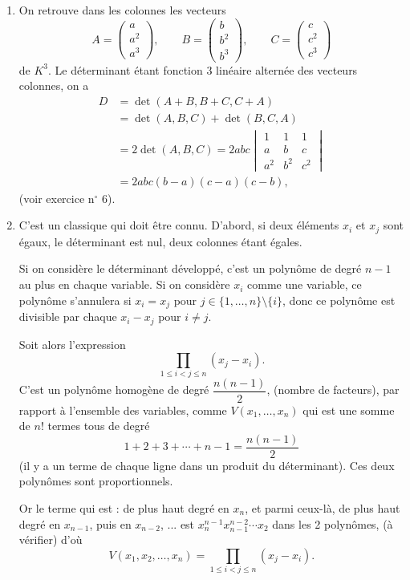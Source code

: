 \begin{enumerate}[label=\arabic*.,leftmargin=2.2em,itemsep=1.2em]
\item On retrouve dans les colonnes les vecteurs
\[
A=\begin{pmatrix}a\\a^2\\a^3\end{pmatrix},\qquad
B=\begin{pmatrix}b\\b^2\\b^3\end{pmatrix},\qquad
C=\begin{pmatrix}c\\c^2\\c^3\end{pmatrix}
\]
de $K^3$. Le déterminant étant fonction 3 linéaire alternée des vecteurs colonnes, on a
\[
\begin{aligned}
D&=\det(A+B,B+C,C+A)\\
&=\det(A,B,C)+\det(B,C,A)\\
&=2\det(A,B,C)
=2abc\begin{vmatrix}1&1&1\\a&b&c\\a^2&b^2&c^2\end{vmatrix}\\
&=2abc(b-a)(c-a)(c-b),
\end{aligned}
\]
(voir exercice n$^\circ$ 6).

\item C'est un classique qui doit être connu. D'abord, si deux éléments $x_i$ et $x_j$ sont égaux, le déterminant est nul, deux colonnes étant égales.

Si on considère le déterminant développé, c'est un polynôme de degré $n-1$ au plus en chaque variable. Si on considère $x_i$ comme une variable, ce polynôme s'annulera si $x_i=x_j$ pour $j\in\{1,\ldots,n\}\setminus\{i\}$, donc ce polynôme est divisible par chaque $x_i-x_j$ pour $i\ne j$.

Soit alors l'expression
\[
\prod_{1\le i<j\le n}(x_j-x_i).
\]
C'est un polynôme homogène de degré $\dfrac{n(n-1)}2$, (nombre de facteurs), par rapport à l'ensemble des variables, comme $V(x_1,\ldots,x_n)$ qui est une somme de $n!$ termes tous de degré
\[
1+2+3+\cdots+n-1=\frac{n(n-1)}2
\]
(il y a un terme de chaque ligne dans un produit du déterminant). Ces deux polynômes sont proportionnels.

Or le terme qui est : de plus haut degré en $x_n$, et parmi ceux-là, de plus haut degré en $x_{n-1}$, puis en $x_{n-2}$, ... est $x_n^{n-1}x_{n-1}^{n-2}\cdots x_2$ dans les 2 polynômes, (à vérifier) d'où
\[
V(x_1,x_2,\ldots,x_n)=\prod_{1\le i<j\le n}(x_j-x_i).
\]


\end{enumerate}
